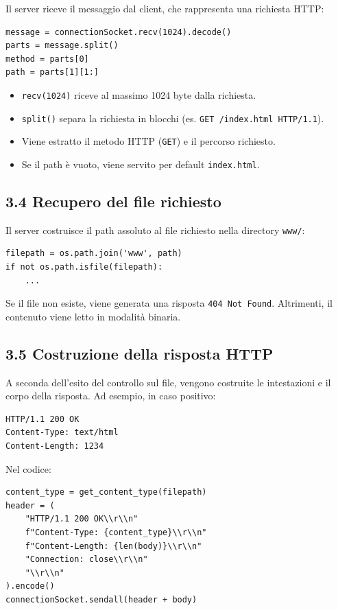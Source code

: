 \documentclass[a4paper,12pt]{report}
\begin{document}
Il server riceve il messaggio dal client, che rappresenta una richiesta HTTP:

\begin{verbatim}
message = connectionSocket.recv(1024).decode()
parts = message.split()
method = parts[0]
path = parts[1][1:]
\end{verbatim}

\begin{itemize}
    \item \texttt{recv(1024)} riceve al massimo 1024 byte dalla richiesta.
    \item \texttt{split()} separa la richiesta in blocchi (es. \texttt{GET /index.html HTTP/1.1}).
    \item Viene estratto il metodo HTTP (\texttt{GET}) e il percorso richiesto.
    \item Se il path è vuoto, viene servito per default \texttt{index.html}.
\end{itemize}


\subsection*{3.4 Recupero del file richiesto}

Il server costruisce il path assoluto al file richiesto nella directory \texttt{www/}:

\begin{verbatim}
filepath = os.path.join('www', path)
if not os.path.isfile(filepath):
    ...
\end{verbatim}

Se il file non esiste, viene generata una risposta \texttt{404 Not Found}. Altrimenti, il contenuto viene letto in modalità binaria.


\subsection*{3.5 Costruzione della risposta HTTP}

A seconda dell’esito del controllo sul file, vengono costruite le intestazioni e il corpo della risposta. Ad esempio, in caso positivo:

\begin{verbatim}
HTTP/1.1 200 OK
Content-Type: text/html
Content-Length: 1234
\end{verbatim}

Nel codice:

\begin{verbatim}
content_type = get_content_type(filepath)
header = (
    "HTTP/1.1 200 OK\\r\\n"
    f"Content-Type: {content_type}\\r\\n"
    f"Content-Length: {len(body)}\\r\\n"
    "Connection: close\\r\\n"
    "\\r\\n"
).encode()
connectionSocket.sendall(header + body)
\end{verbatim}
\end{document}
